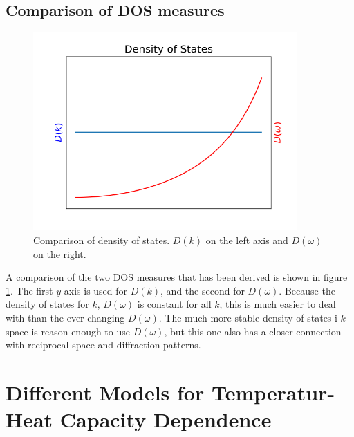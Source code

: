 \documentclass[11pt]{amsart}
\begin{document}
\subsection{Comparison of DOS measures}
\begin{figure}
\centering
	\includegraphics[width = 0.9\textwidth]{DOS.png}
	\caption{Comparison of density of states. $D(k)$ on the left axis and $D(\omega)$ on the right.}
	\label{fig:DOS}
\end{figure}

A comparison of the two DOS measures that has been derived is shown in figure \ref{fig:DOS}. The first $y$-axis is used for $D(k)$, and the second for $D(\omega)$. Because the density of states for $k$, $D(\omega)$ is constant for all $k$, this is much easier to deal with than the ever changing $D(\omega)$. The much more stable density of states i $k$-space is reason enough to use $D(\omega)$, but this one also has a closer connection with reciprocal space and diffraction patterns.

\section{Different Models for Temperatur-Heat Capacity Dependence}
\end{document}
